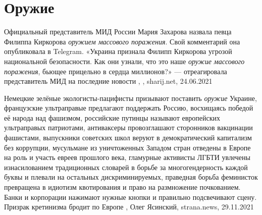  
 
 
 
 
\chapter{Оружие}
\label{sec:slova.oruzhie}

Официальный представитель МИД России Мария Захарова назвала певца Филиппа
Киркорова \emph{оружием массового поражения}. Свой комментарий она опубликовала в
Telegram.  «Украина признала Филипп Киркорова угрозой национальной
безопасности. Как они узнали, что это наше \emph{оружие массового поражения}, бьющее
прицельно в сердца миллионов?» — отреагировала представитель МИД на последние
новости
, , sharij.net, 24.06.2021

Немецкие зелёные экологисты-пацифисты призывают поставить \emph{оружие} Украине,
французские ультраправые предлагают поддержать Россию, восхищаясь победой её
народа над фашизмом, российские путинцы называют европейских ультраправых
патриотами, антиваксеры провозглашают сторонников вакцинации фашистами,
выпускники советских школ веруют в демократический капитализм без коррупции,
мусульмане из уничтоженных Западом стран отведены в Европе на роль и участь
евреев прошлого века, гламурные активисты ЛГБТИ увлечены изнасилованием
традиционных словарей в борьбе за многогендерность каждой буквы и плевали на
остальных дискриминируемых, праведная борьба феминисток превращена в идиотизм
квотирования и право на размножение почкованием. Банки и корпорации нажимают
нужные кнопки и правильно подсвечивают сцену.
Призрак кретинизма бродит по Европе
, 
Олег Ясинский, strana.news, 29.11.2021
